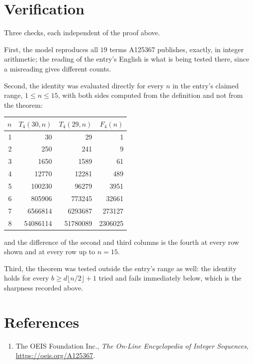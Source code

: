 \documentclass[11pt,a4paper]{article}
\theoremstyle{plain}
\theoremstyle{definition}
\begin{document}
\section{Verification}

Three checks, each independent of the proof above.

First, the model reproduces all $19$ terms A125367 publishes, exactly, in integer
arithmetic; the reading of the entry's English is what is being tested there, since a
misreading gives different counts.

Second, the identity was evaluated directly for every $n$ in the entry's claimed range,
$1\le n\le15$, with both sides computed from the definition and not from the theorem:

\begin{center}
\begin{tabular}{rrrr}
$n$ & $T_{4}(30,n)$ & $T_{4}(29,n)$ & $F_{4}(n)$ \\ \hline
1 & 30 & 29 & 1 \\
2 & 250 & 241 & 9 \\
3 & 1650 & 1589 & 61 \\
4 & 12770 & 12281 & 489 \\
5 & 100230 & 96279 & 3951 \\
6 & 805906 & 773245 & 32661 \\
7 & 6566814 & 6293687 & 273127 \\
8 & 54086114 & 51780089 & 2306025 \\
\end{tabular}
\end{center}

\noindent and the difference of the second and third columns is the fourth at every row shown
and at every row up to $n=15$.

Third, the theorem was tested outside the entry's range as well: the identity holds for every
$b\ge d\lfloor n/2\rfloor+1$ tried and fails immediately below, which is the sharpness recorded
above.

\section*{References}
\begin{enumerate}
\item The OEIS Foundation Inc., \emph{The On-Line Encyclopedia of Integer Sequences},
\url{https://oeis.org/A125367}.
\end{enumerate}
\end{document}
